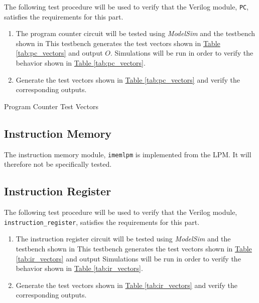 The following test procedure will be used to verify that the Verilog module, \verb|PC|, satisfies the requirements for this part.

\begin{enumerate}
    \item The program counter circuit will be tested using \emph{ModelSim} and the testbench shown in %
    This testbench generates the test vectors shown in \hyperref[tab:pc_vectors]{Table \ref*{tab:pc_vectors}} and output $O$.
    Simulations will be run in order to verify the behavior shown in \hyperref[tab:pc_vectors]{Table \ref*{tab:pc_vectors}}.
    \item Generate the test vectors shown in \hyperref[tab:pc_vectors]{Table \ref*{tab:pc_vectors}}
    and verify the corresponding outputs.
\end{enumerate}

\begin{table}[htbp]
    \centering
    \caption{Program Counter Test Vectors\label{tab:pc_vectors}}
\end{table}


\subsection{Instruction Memory} %
\label{sub:instruction_memory}

The instruction memory module, \verb|imemlpm| is implemented from the LPM.
It will therefore not be specifically tested.


\subsection{Instruction Register} %
\label{sub:instruction_register_pro}

The following test procedure will be used to verify that the Verilog module, \verb|instruction_register|, satisfies the requirements for this part.

\begin{enumerate}
    \item The instruction register circuit will be tested using \emph{ModelSim} and the testbench shown in %
    This testbench generates the test vectors shown in \hyperref[tab:ir_vectors]{Table \ref*{tab:ir_vectors}} and output %
    Simulations will be run in order to verify the behavior shown in \hyperref[tab:ir_vectors]{Table \ref*{tab:ir_vectors}}.
    \item Generate the test vectors shown in \hyperref[tab:ir_vectors]{Table \ref*{tab:ir_vectors}}
    and verify the corresponding outputs.
\end{enumerate}

